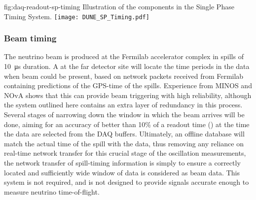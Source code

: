 \begin{dunefigure}{fig:daq-readout-sp-timing}
  {Illustration of the components in the Single Phase Timing System.}
  \texttt{[image: DUNE\_SP\_Timing.pdf]}
\end{dunefigure}

\subsubsection{Beam timing}
\label{sec:fd-daq-design-beamtiming}

The neutrino beam is produced at the Fermilab accelerator complex in
spills of \SI{10}{\us} duration.  A  at the far
detector site will locate the time periods in the data when beam could
be present, based on network packets received from Fermilab containing
predictions of the GPS-time of the spills.  Experience from
MINOS and NOvA shows that this can provide beam triggering with high
reliability, although the system outlined here contains an extra layer
of redundancy in this process.  Several stages of narrowing down the
window in which the beam arrives will be done, aiming for an accuracy
of better than 10\% of a readout time (\readout) at the time the data
are selected from the DAQ buffers.  Ultimately, an offline database
will match the actual time of the spill with the data, thus removing
any reliance on real-time network transfer for this crucial stage of
the oscillation measurements, the network transfer of spill-timing
information is simply to ensure a correctly located and sufficiently
wide window of data is considered as beam data. This system is not
required, and is not designed to provide signals accurate enough to
measure neutrino time-of-flight.

